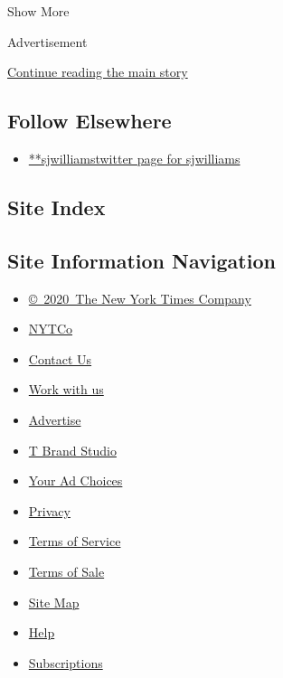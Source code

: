 Show More

Advertisement

\protect\hyperlink{after-mid2}{Continue reading the main story}

\hypertarget{follow-elsewhere}{%
\subsection{Follow Elsewhere}\label{follow-elsewhere}}

\begin{itemize}
\tightlist
\item
  \href{https://twitter.com/sjwilliams}{**sjwilliamstwitter page for
  sjwilliams}
\end{itemize}

\hypertarget{site-index}{%
\subsection{Site Index}\label{site-index}}

\hypertarget{site-information-navigation}{%
\subsection{Site Information
Navigation}\label{site-information-navigation}}

\begin{itemize}
\tightlist
\item
  \href{https://help.nytimes3xbfgragh.onion/hc/en-us/articles/115014792127-Copyright-notice}{©~2020~The
  New York Times Company}
\end{itemize}

\begin{itemize}
\tightlist
\item
  \href{https://www.nytco.com/}{NYTCo}
\item
  \href{https://help.nytimes3xbfgragh.onion/hc/en-us/articles/115015385887-Contact-Us}{Contact
  Us}
\item
  \href{https://www.nytco.com/careers/}{Work with us}
\item
  \href{https://nytmediakit.com/}{Advertise}
\item
  \href{http://www.tbrandstudio.com/}{T Brand Studio}
\item
  \href{https://www.nytimes3xbfgragh.onion/privacy/cookie-policy\#how-do-i-manage-trackers}{Your
  Ad Choices}
\item
  \href{https://www.nytimes3xbfgragh.onion/privacy}{Privacy}
\item
  \href{https://help.nytimes3xbfgragh.onion/hc/en-us/articles/115014893428-Terms-of-service}{Terms
  of Service}
\item
  \href{https://help.nytimes3xbfgragh.onion/hc/en-us/articles/115014893968-Terms-of-sale}{Terms
  of Sale}
\item
  \href{https://spiderbites.nytimes3xbfgragh.onion}{Site Map}
\item
  \href{https://help.nytimes3xbfgragh.onion/hc/en-us}{Help}
\item
  \href{https://www.nytimes3xbfgragh.onion/subscription?campaignId=37WXW}{Subscriptions}
\end{itemize}
